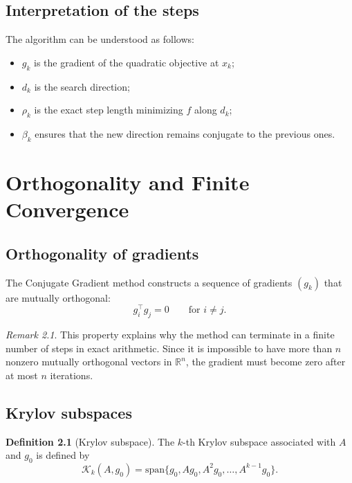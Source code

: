\documentclass[11pt,a4paper]{report}
\theoremstyle{definition}
\newtheorem{definition}{Definition}[chapter]
\theoremstyle{plain}
\theoremstyle{remark}
\newtheorem{remark}{Remark}[chapter]
\begin{document}
\section{Interpretation of the steps}

The algorithm can be understood as follows:
\begin{itemize}
    \item $g_k$ is the gradient of the quadratic objective at $x_k$;
    \item $d_k$ is the search direction;
    \item $\rho_k$ is the exact step length minimizing $f$ along $d_k$;
    \item $\beta_k$ ensures that the new direction remains conjugate to the previous ones.
\end{itemize}

\chapter{Orthogonality and Finite Convergence}

\section{Orthogonality of gradients}

The Conjugate Gradient method constructs a sequence of gradients $(g_k)$ that are mutually orthogonal:
\[
g_i^\top g_j=0
\qquad\text{for }i\neq j.
\]

\begin{remark}
This property explains why the method can terminate in a finite number of steps in exact arithmetic. Since it is impossible to have more than $n$ nonzero mutually orthogonal vectors in $\mathbb{R}^n$, the gradient must become zero after at most $n$ iterations.
\end{remark}

\section{Krylov subspaces}

\begin{definition}[Krylov subspace]
The $k$-th Krylov subspace associated with $A$ and $g_0$ is defined by
\[
\mathcal{K}_k(A,g_0)
=
\mathrm{span}\{g_0,Ag_0,A^2g_0,\dots,A^{k-1}g_0\}.
\]
\end{definition}
\end{document}
